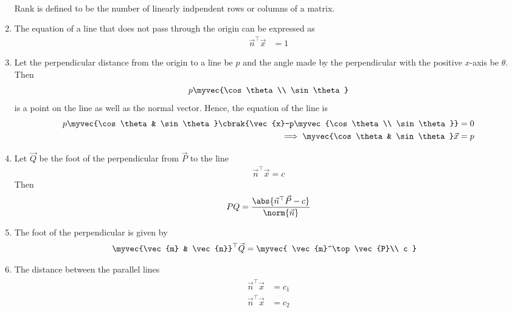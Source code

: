\begin{enumerate}[label=\thesubsection.\arabic*.,ref=\thesubsection.\theenumi]
\begin{align}
		\end{align}
			  Rank is defined to be the number of linearly indpendent rows or columns of a matrix.
			  \fi
		\item
The equation of a line that does not pass through the origin can be expressed as
\begin{align}
	 \vec{n}^{\top}\vec{x} &=   1
		\label{prop:lin-eq-unit}
\end{align}
\item Let the perpendicular distance from the origin to a line be $p$ and the angle made by the perpendicular with the positive $x$-axis be $\theta$.
	Then 
\begin{align}
	p\myvec{\cos \theta \\ \sin \theta}
\end{align}
is a point on the line as well as the normal vector.
Hence, the equation of the line is 
\begin{align}
	p\myvec{\cos \theta & \sin \theta}
	\cbrak{\vec{x}-p\myvec{\cos \theta \\ \sin \theta}} &= 0
	\\
	\implies 
	\myvec{\cos \theta & \sin \theta}
	\vec{x} &= p
\label{eq:chapters/11/10/2/8-final}
\end{align}
\item Let $\vec{Q}$ be the foot of the perpendicular from $\vec{P}$
	to the line
\begin{align}
			\label{eq:geo-norm-app}
    \vec{n}^{\top}  \vec{x} = c
\end{align}
Then
\begin{align}
PQ =  
	\frac{\abs{\vec{n}^{\top}\vec{P} - c}}{\norm{\vec{n}}}
			\label{eq:PQ-final}
\end{align}
\item The foot of the perpendicular is given by
\begin{align}
	\label{eq:11/10/3/4/foot_of_perpendicular}
	\myvec{\vec{m} & \vec{n}}^\top\vec{Q} &= 
	   \myvec{
              \vec{m}^\top\vec{P}\\
	      c
	      }
\end{align}
\item The distance between the parallel lines 
\begin{align}
	\label{eq:parallel_lines}
	\begin{split}
		\vec{n}^{\top}\vec{x} &= c_1
		\\
		\vec{n}^{\top}\vec{x} &= c_2
	\end{split}
\end{align}

\end{enumerate}
